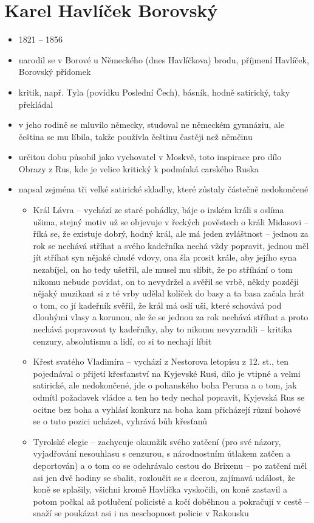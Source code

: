 \documentclass{article}
\begin{document}
\section{Karel Havlíček Borovský}
\begin{itemize}
  \item 1821 -- 1856
  \item narodil se v Borové u Německého (dnes Havlíčkova) brodu, příjmení Havlíček, Borovský přídomek
  \item kritik, např. Tyla (povídku Poslední Čech), básník, hodně satirický, taky překládal
  \item v jeho rodině se mluvilo německy, studoval ne německém gymnáziu, ale čeština se mu líbila, takže používla češtinu častěji než němčinu
  \item určitou dobu působil jako vychovatel v Moskvě, toto inspirace pro dílo Obrazy z Rus, kde je velice kritický k podmínká carského Ruska
  \item napsal zejména tři velké satirické skladby, které zůstaly částečně nedokončené
  \begin{itemize}
    \item Král Lávra -- vychází ze staré pohádky, báje o irském králi s oslíma
    ušima, stejný motiv už se objevuje v řeckých pověstech o králi Midasovi -- říká se, že existuje dobrý, hodný král, ale má jeden zvláštnost -- jednou za rok se nechává stříhat a svého kadeřníka nechá vždy popravit, jednou měl jít stříhat syn nějaké chudé vdovy, ona šla prosit krále, aby jejího syna nezabíjel, on ho tedy ušetřil, ale musel mu slíbit, že po stříhání o tom nikomu nebude povídat, on to nevydržel a svěřil se vrbě, někdy později nějaký muzikant si z té vrby udělal kolíček do basy a ta basa začala hrát o tom, co jí kadeřník svěřil, že král má oslí uši, které schovává pod dlouhými vlasy a korunou, ale že se jednou za rok nechává stříhat a proto nechává popravovat ty kadeřníky, aby to nikomu nevyzradili -- kritika cenzury, absolutismu a lidí, co si to nechají líbit
    \item Křest svatého Vladimíra -- vychází z Nestorova letopisu z 12. st., ten pojednával o přijetí křesťanství na Kyjevské Rusi, dílo je vtipné a velmi satirické, ale nedokončené, jde o pohanského boha Peruna a o tom, jak odmítl požadavek vládce a ten ho tedy nechal popravit, Kyjevská Rus se ocitne bez boha a vyhlásí konkurz na boha kam přicházejí různí bohové se o tuto pozici ucházet, vyhrává bůh křesťanů
    \item Tyrolské elegie -- zachycuje okamžik svého zatčení (pro své názory, vyjadřování nesouhlasu s cenzurou, s národnostním útlakem zatčen a deportován) a o tom co se odehrávalo cestou do Brixenu -- po zatčení měl asi jen dvě hodiny se sbalit, rozloučit se s dcerou, zajímavá událost, že koně se splašily, všichni kromě Havlíčka vyskočili, on koně zastavil a potom počkal až potlučení policisté a kočí doběhnou a pokračují v cestě -- snaží se poukázat asi i na neschopnost policie v Rakousku

\end{itemize}
\end{itemize}
\end{document}
